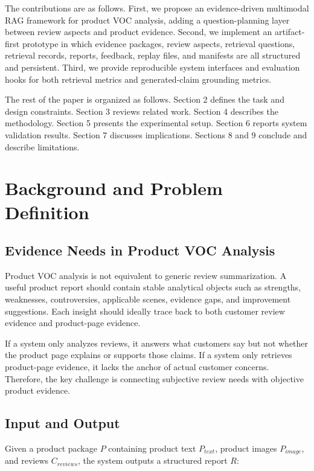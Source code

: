 \documentclass[11pt]{article}
\begin{document}
The contributions are as follows. First, we propose an evidence-driven multimodal RAG framework for product VOC analysis, adding a question-planning layer between review aspects and product evidence. Second, we implement an artifact-first prototype in which evidence packages, review aspects, retrieval questions, retrieval records, reports, feedback, replay files, and manifests are all structured and persistent. Third, we provide reproducible system interfaces and evaluation hooks for both retrieval metrics and generated-claim grounding metrics.

The rest of the paper is organized as follows. Section 2 defines the task and design constraints. Section 3 reviews related work. Section 4 describes the methodology. Section 5 presents the experimental setup. Section 6 reports system validation results. Section 7 discusses implications. Sections 8 and 9 conclude and describe limitations.

\section{Background and Problem Definition}
\subsection{Evidence Needs in Product VOC Analysis}

Product VOC analysis is not equivalent to generic review summarization. A useful product report should contain stable analytical objects such as strengths, weaknesses, controversies, applicable scenes, evidence gaps, and improvement suggestions. Each insight should ideally trace back to both customer review evidence and product-page evidence.

If a system only analyzes reviews, it answers what customers say but not whether the product page explains or supports those claims. If a system only retrieves product-page evidence, it lacks the anchor of actual customer concerns. Therefore, the key challenge is connecting subjective review needs with objective product evidence.

\subsection{Input and Output}

Given a product package \(P\) containing product text \(P_{text}\), product images \(P_{image}\), and reviews \(C_{reviews}\), the system outputs a structured report \(R\):
\end{document}
